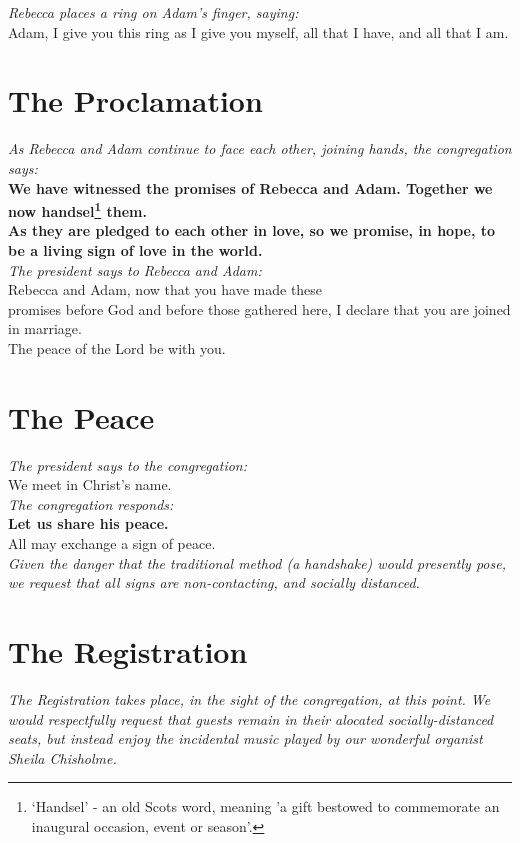 \documentclass[a4paper,10pt,titlepage]{article}
\begin{document}
{\em Rebecca places a ring on Adam's finger, saying:}\\
Adam, I give you this ring as I give you myself, all that I have, and all that I am.

\clearpage
\section{The Proclamation}

{\em As Rebecca and Adam continue to face each other, joining hands, the congregation says:}\\
{\bf We have witnessed the promises of Rebecca and Adam.
Together we now handsel\footnote{`Handsel' - an old Scots word, meaning 'a gift bestowed to commemorate an inaugural occasion, event or season'.} them.\\
As they are pledged to each other in love, so we promise, in hope, to be a living sign of love in the world.}\\

{\em The president says to Rebecca and Adam:}\\
Rebecca and Adam, now that you have made these\\ promises before God and before those gathered here, I declare that you are joined in marriage.\\
The peace of the Lord be with you.

\section{The Peace}

{\em The president says to the congregation:}\\
We meet in Christ's name.\\

{\em The congregation responds:}\\
{\bf Let us share his peace.}\\

All may exchange a sign of peace.\\

{\em Given the danger that the traditional method (a handshake) would presently pose, we request that all signs are non-contacting, and socially distanced.}

\section{The Registration} 

{\em The Registration takes place, in the sight of the congregation, at this point. We would respectfully request that guests remain in their alocated socially-distanced seats, but instead enjoy the incidental music played by our wonderful organist Sheila Chisholme.}
\end{document}
